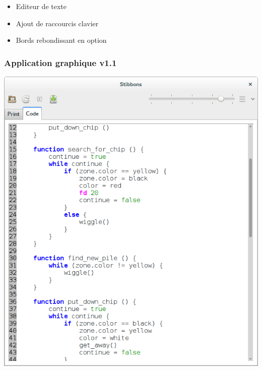 \begin{frame}
\begin{itemize}
	\item Editeur de texte
	\item Ajout de raccourcis clavier
	\item Bords rebondissant en option
\end{itemize}
\end{frame}

\begin{frame}
\frametitle{Application graphique v1.1}
\begin{center}
\includegraphics[scale=0.16]{doc/report/screenshot/stibbons-0-5-2.png}
~~~~~~~~

\end{center}
\end{frame}
